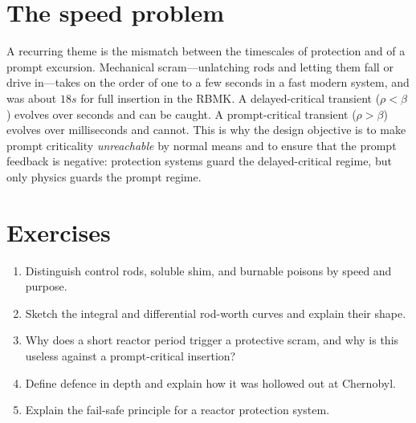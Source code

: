 \section{The speed problem}

A recurring theme is the mismatch between the timescales of protection and of a
prompt excursion. Mechanical scram---unlatching rods and letting them fall or drive
in---takes on the order of one to a few seconds in a fast modern system, and was
about $18\unit{s}$ for full insertion in the RBMK. A delayed-critical transient
($\rho<\beta$) evolves over seconds and can be caught. A prompt-critical transient
($\rho>\beta$) evolves over milliseconds and cannot. This is why the design
objective is to make prompt criticality \emph{unreachable} by normal means and to
ensure that the prompt feedback is negative: protection systems guard the
delayed-critical regime, but only physics guards the prompt regime.


\section*{Exercises}
\begin{enumerate}[leftmargin=*,itemsep=2pt]
\item Distinguish control rods, soluble shim, and burnable poisons by speed and purpose.
\item Sketch the integral and differential rod-worth curves and explain their shape.
\item Why does a short reactor period trigger a protective scram, and why is this useless against a prompt-critical insertion?
\item Define defence in depth and explain how it was hollowed out at Chernobyl.
\item Explain the fail-safe principle for a reactor protection system.
\end{enumerate}
